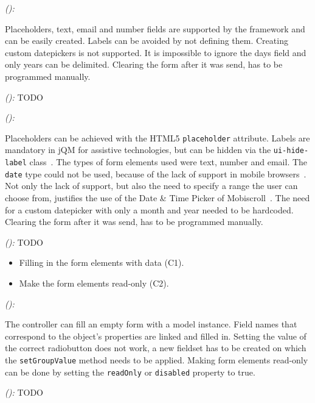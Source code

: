 \documentclass[a4paper]{artikel3}
\newcommand{\code}[1]{\texttt{#1}}
\newcommand{\framework}[2]{ \emph{#1 (\textbf{#2}): }} %
\begin{document}
\framework{\sta{}}{}

Placeholders, text, email and number fields are supported by the framework and can be easily created.  
Labels can be avoided by not defining them.  
Creating custom datepickers is not supported.  
It is impossible to ignore the days field and only years can be delimited.  
Clearing the form after it was send, has to be programmed manually.

\framework{\kendoa{}}{}
TODO

\framework{\jqma{}}{}

Placeholders can be achieved with the HTML5 \code{placeholder} attribute.
Labels are mandatory in jQM for assistive technologies, but can be hidden via the \code{ui-hide-label} class~\cite{JQuery2013}. 
The types of form elements used were text, number and email.
The \code{date} type could not be used, because of the lack of support in mobile browsers~\cite{Deveria2013b}.
Not only the lack of support, but also the need to specify a range the user can choose from, justifies the use of the Date \& Time Picker of Mobiscroll~\cite{Mobiscroll2013}.
The need for a custom datepicker with only a month and year needed to be hardcoded.
Clearing the form after it was send, has to be programmed manually.

\framework{\lungoa{}}{}
TODO


\begin{itemize}
  \item Filling in the form elements with data (C1).
  \item Make the form elements read-only (C2).
\end{itemize}

\framework{\sta{}}{}

The controller can fill an empty form with a model instance.
Field names that correspond to the object's properties are linked and filled in.
Setting the value of the correct radiobutton does not work,  a new fieldset has to be created on which the \code{setGroupValue} method needs to be applied.  
Making form elements read-only can be done by setting the \code{readOnly} or \code{disabled} property to true.

\framework{\kendoa{}}{}
TODO
\end{document}
